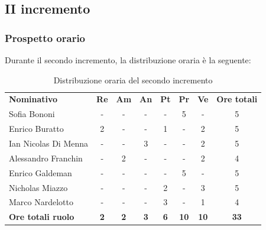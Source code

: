 \documentclass[../piano-di-progetto.tex]{subfiles}
\begin{document}
  \subsection{II incremento}

  \subsubsection{Prospetto orario}
 Durante il secondo incremento, la distribuzione oraria è la seguente:
  \begin{table}[H]
    \centering
    \begin{tabular}{lccccccc}
    \rowcolor{lightgray}
    \textbf{Nominativo}       & \textbf{Re} & \textbf{Am} & \textbf{An} & \textbf{Pt} & \textbf{Pr} & \textbf{Ve} & \textbf{Ore totali} \\
Sofia Bononi              & -           & -           & -           & -           & 5           & -           & 5                   \\
Enrico Buratto            & 2           & -           & -           & 1           & -           & 2           & 5                   \\
Ian Nicolas Di Menna      & -           & -           & 3           & -           & -           & 2           & 5                   \\
Alessandro Franchin       & -           & 2           & -           & -           & -           & 2           & 4                   \\
Enrico Galdeman           & -           & -           & -           & -           & 5           & -           & 5                   \\
Nicholas Miazzo           & -           & -           & -           & 2           & -           & 3           & 5                   \\
Marco Nardelotto          & -           & -           & -           & 3           & -           & 1           & 4                   \\
\textbf{Ore totali ruolo} & \textbf{2}  & \textbf{2}  & \textbf{3}  & \textbf{6}  & \textbf{10} & \textbf{10} & \textbf{33}        
    
    \end{tabular}
    \caption{Distribuzione oraria del secondo incremento}
  \end{table}
\end{document}
